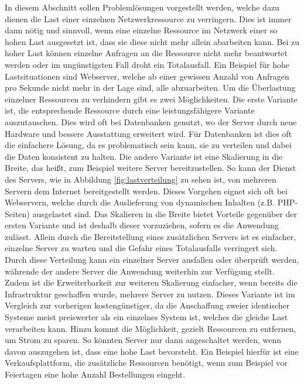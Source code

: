 \documentclass[a4paper, 12pt, BCOR10mm, DIV12, toc=bibliography, toc=listof, german]{scrbook}
\begin{document}
		In diesem Abschnitt sollen Problemlösungen vorgestellt werden, welche dazu dienen die Last einer
		einzelnen Netzwerkressource zu verringern. Dies ist immer dann nötig und sinnvoll, wenn eine
		einzelne Ressource im Netzwerk einer so hohen Last ausgesetzt ist, dass sie diese nicht mehr
		allein abarbeiten kann. Bei zu hoher Last können einzelne Anfragen an die Ressource nicht mehr
		beantwortet werden oder im ungünstigsten Fall droht ein Totalausfall. Ein Beispiel für hohe
		Lastsituationen sind Webserver, welche ab einer gewissen Anzahl von Anfragen pro Sekunde nicht
		mehr in der Lage sind, alle abzuarbeiten. Um die Überlastung einzelner Ressourcen zu verhindern
		gibt es zwei Möglichkeiten. Die erste Variante ist, die entsprechende Ressource durch eine
		leistungsfähigere Variante auszutauschen. Dies wird oft bei Datenbanken genutzt, wo der Server
		durch neue Hardware und bessere Ausstattung erweitert wird.  Für Datenbanken ist dies oft die
		einfachere Lösung, da es problematisch sein kann, sie zu verteilen und dabei die Daten
		konsistent zu halten. Die andere Variante ist eine Skalierung in die Breite, das heißt, zum
		Beispiel weitere Server bereitzustellen. So kann der Dienst des Servers, wie in Abbildung
		\ref{fig:lastverteilung} zu sehen ist, von mehreren Servern dem Internet bereitgestellt werden.
		Dieses Vorgehen eignet sich oft bei Webservern, welche durch die Auslieferung von dynamischen
		Inhalten (z.B. PHP-Seiten) ausgelastet sind. Das Skalieren in die Breite bietet Vorteile
		gegenüber der ersten Variante und ist deshalb dieser vorzuziehen, sofern es die Anwendung
		zulässt. Allein durch die Bereitstellung eines zusätzlichen Servers ist es einfacher, einzelne
		Server zu warten und die Gefahr eines Totalausfalls verringert sich. Durch diese Verteilung kann
		ein einzelner Server ausfallen oder überprüft werden, währende der andere Server die Anwendung
		weiterhin zur Verfügung stellt. Zudem ist die Erweiterbarkeit zur weiteren Skalierung einfacher,
		wenn bereits die Infrastruktur geschaffen wurde, mehrere Server zu nutzen. Dieses Variante ist
		im Vergleich zur vorherigen kostengünstiger, da die Anschaffung zweier identischer Systeme meist
		preiswerter als ein einzelnes System ist, welches die gleiche Last verarbeiten kann.  Hinzu
		kommt die Möglichkeit, gezielt Ressourcen zu entfernen, um Strom zu sparen. So könnten Server
		nur dann angeschaltet werden, wenn davon auszugehen ist, dass eine hohe Last bevorsteht. Ein
		Beispiel hierfür ist eine Verkaufsplattform, die zusätzliche Ressourcen benötigt, wenn zum
		Beispiel vor Feiertagen eine hohe Anzahl Bestellungen eingeht.
\end{document}
